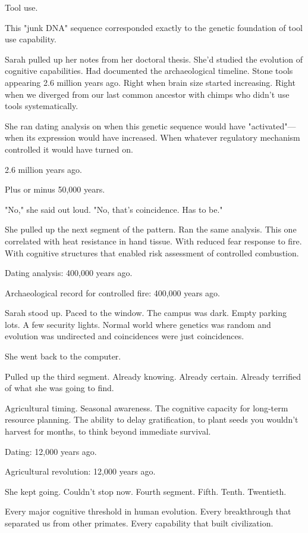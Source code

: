 Tool use.

This "junk DNA" sequence corresponded exactly to the genetic foundation of tool use capability.

Sarah pulled up her notes from her doctoral thesis. She'd studied the evolution of cognitive capabilities. Had documented the archaeological timeline. Stone tools appearing 2.6 million years ago. Right when brain size started increasing. Right when we diverged from our last common ancestor with chimps who didn't use tools systematically.

She ran dating analysis on when this genetic sequence would have "activated"—when its expression would have increased. When whatever regulatory mechanism controlled it would have turned on.

2.6 million years ago.

Plus or minus 50,000 years.

"No," she said out loud. "No, that's coincidence. Has to be."

She pulled up the next segment of the pattern. Ran the same analysis. This one correlated with heat resistance in hand tissue. With reduced fear response to fire. With cognitive structures that enabled risk assessment of controlled combustion.

Dating analysis: 400,000 years ago.

Archaeological record for controlled fire: 400,000 years ago.

Sarah stood up. Paced to the window. The campus was dark. Empty parking lots. A few security lights. Normal world where genetics was random and evolution was undirected and coincidences were just coincidences.

She went back to the computer.

Pulled up the third segment. Already knowing. Already certain. Already terrified of what she was going to find.

Agricultural timing. Seasonal awareness. The cognitive capacity for long-term resource planning. The ability to delay gratification, to plant seeds you wouldn't harvest for months, to think beyond immediate survival.

Dating: 12,000 years ago.

Agricultural revolution: 12,000 years ago.

She kept going. Couldn't stop now. Fourth segment. Fifth. Tenth. Twentieth.

Every major cognitive threshold in human evolution. Every breakthrough that separated us from other primates. Every capability that built civilization.


